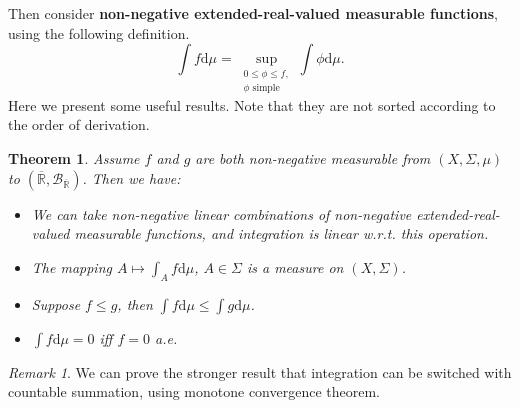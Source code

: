 \documentclass[openany]{book}
\newtheorem{theorem}{Theorem}[chapter]
\theoremstyle{definition}
\theoremstyle{remark}
\newtheorem*{remark}{Remark}
\begin{document}
Then consider \textbf{non-negative extended-real-valued measurable functions}, using the following definition.
\begin{equation*}
    \int f \mathrm{d}\mu=\sup_{\substack{0\le\phi\le f,\\\phi\textrm{ simple}}}\int\phi \mathrm{d}\mu.
\end{equation*}
Here we present some useful results. Note that they are not sorted according to the order of derivation.
\begin{theorem}
    Assume $f$ and $g$ are both non-negative measurable from $(X,\Sigma,\mu)$ to $(\overline{\mathbb{R}},\mathcal{B}_{\overline{\mathbb{R}}})$. Then we have:
    \begin{itemize}
        \item We can take non-negative linear combinations of non-negative extended-real-valued measurable functions, and integration is linear w.r.t. this operation.
        \item The mapping $A\mapsto\int_Af \mathrm{d}\mu$, $A\in\Sigma$ is a measure on $(X,\Sigma)$.
        \item Suppose $f\le g$, then $\int f \mathrm{d}\mu\le\int g \mathrm{d}\mu$.
        \item $\int f \mathrm{d}\mu=0$ iff $f=0$ a.e.
    \end{itemize}
\end{theorem}
\begin{remark}
    We can prove the stronger result that integration can be switched with countable summation, using monotone convergence theorem.
\end{remark}
\end{document}
